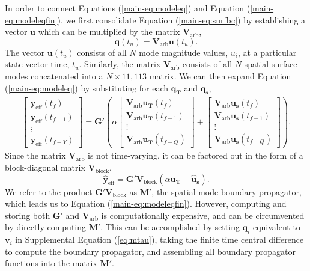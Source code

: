 \documentclass[draft]{agujournal2019}
\begin{document}
In order to connect Equations (\ref{main-eq:modeleq}) and Equation (\ref{main-eq:modeleqfin}), we first consolidate Equation (\ref{main-eq:surfbc}) by establishing a vector $\mathbf{u}$ which can be multiplied by the matrix $\mathbf{V}_{\mathrm{arb}}$, 
\begin{equation}
\label{eq:2}
\mathbf{q}(t_{u}) = \mathbf{V}_{\mathrm{arb}}\mathbf{u}(t_{u}). 
\end{equation}
The vector $\mathbf{u}(t_{u})$ consists of all $N$ mode magnitude values, $u_{i}$, at a particular state vector time, $t_{u}$. Similarly, the matrix $\mathbf{V}_{\mathrm{arb}}$ consists of all $N$ spatial surface modes concatenated into a $N \times 11,113$ matrix. We can then expand Equation (\ref{main-eq:modeleq}) by substituting for each $\mathbf{q_{T}}$ and $\mathbf{q_{s}}$, 
\begin{align}
\label{eq:1}
\begin{bmatrix}
\mathbf{y}_{\mathrm{eff}}(t_{f})\\
\mathbf{y}_{\mathrm{eff}}(t_{f-1})\\
\vdots \\
\mathbf{y}_{\mathrm{eff}}(t_{f-Y})
\end{bmatrix}                         
  = \mathbf{G}' \left( \alpha
  \begin{bmatrix}
\mathbf{V}_{\mathrm{arb}}\mathbf{u_{T}}(t_{f}) \\
\mathbf{V}_{\mathrm{arb}}\mathbf{u_{T}}(t_{f-1})\\
\vdots \\
\mathbf{V}_{\mathrm{arb}}\mathbf{u_{T}}(t_{f-Q})
  \end{bmatrix} +
  \begin{bmatrix}
\mathbf{V}_{\mathrm{arb}}\mathbf{u_{s}}(t_{f})\\
\mathbf{V}_{\mathrm{arb}}\mathbf{u_{s}}(t_{f-1})\\
\vdots \\
\mathbf{V}_{\mathrm{arb}}\mathbf{u_{s}}(t_{f-Q})
  \end{bmatrix}  
  \right). 
\end{align}
Since the matrix $\mathbf{V}_{\mathrm{arb}}$ is not time-varying, it can be factored out in the form of a block-diagonal matrix $\mathbf{V}_{\mathrm{block}}$, 
\begin{equation}
\label{eq:3}
\mathbf{\hat{y}}_{\mathrm{eff}} = \mathbf{G'V}_{\mathrm{block}} (\alpha \mathbf{\hat{u}_{T}} + \mathbf{\hat{u}_{s}}). 
\end{equation}
We refer to the product $\mathbf{G'V}_{\mathrm{block}}$ as $\mathbf{M'}$, the spatial mode boundary propagator, which leads us to Equation (\ref{main-eq:modeleqfin}). However, computing and storing both $\mathbf{G}'$ and $\mathbf{V}_{\mathrm{arb}}$ is computationally expensive, and can be circumvented by directly computing $\mathbf{M'}$. This can be accomplished by setting $\mathbf{q}_{i}$ equivalent to $\mathbf{v}_{i}$ in Supplemental Equation (\ref{eq:mtau}), taking the finite time central difference to compute the boundary propagator, and assembling all boundary propagator functions into the matrix $\mathbf{M'}$. 
\end{document}
